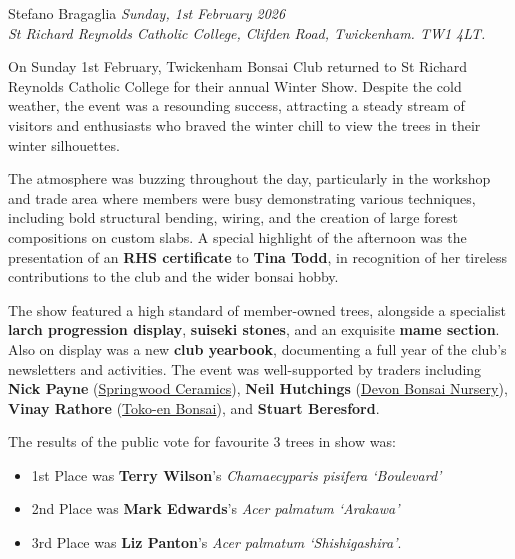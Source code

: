        {Stefano Bragaglia}
\label{2026-01-show}
\noindent
\textit{Sunday, 1st February 2026} \\
\textit{St Richard Reynolds Catholic College, Clifden Road, Twickenham. TW1 4LT.}

\medskip
On Sunday 1st February, Twickenham Bonsai Club returned to St Richard Reynolds Catholic College for their annual Winter Show.
Despite the cold weather, the event was a resounding success, attracting a steady stream of visitors and enthusiasts who braved the winter chill to view the trees in their winter silhouettes.

\medskip
The atmosphere was buzzing throughout the day, particularly in the workshop and trade area where members were busy demonstrating various techniques, including bold structural bending, wiring, and the creation of large forest compositions on custom slabs.
A special highlight of the afternoon was the presentation of an \textbf{RHS certificate} to \textbf{Tina Todd}, in recognition of her tireless contributions to the club and the wider bonsai hobby.

\medskip
The show featured a high standard of member\--owned trees, alongside a specialist \textbf{larch progression display}, \textbf{suiseki stones}, and an exquisite \textbf{mame section}.
Also on display was a new \textbf{club yearbook}, documenting a full year of the club's newsletters and activities.
The event was well\--supported by traders including \textbf{Nick Payne} (\href{https://www.instagram.com/springwood_ceramics/}{Springwood Ceramics}), \textbf{Neil Hutchings} (\href{htthttps://www.instagram.com/devon_bonsai_nursery/}{Devon Bonsai Nursery}), \textbf{Vinay Rathore} (\href{https://www.instagram.com/tokoen.bonsai.uk}{Toko-en Bonsai}), and \textbf{Stuart Beresford}.

\medskip
The results of the public vote for favourite 3 trees in show was:

\begin{itemize}
    \item 1st Place was \textbf{Terry Wilson}'s \textit{Chamaecyparis pisifera `Boulevard'}

    \item 2nd Place was \textbf{Mark Edwards}'s \textit{Acer palmatum `Arakawa'}

    \item 3rd Place was \textbf{Liz Panton}'s \textit{Acer palmatum `Shishigashira'}.
\end{itemize}

